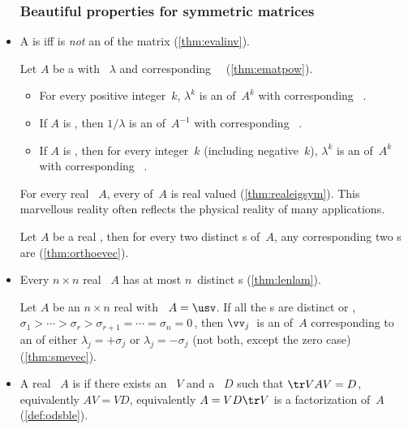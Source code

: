 \begin{itemize}
\subsubsection{Beautiful properties for symmetric matrices}

\item A  is  iff  is \emph{not} an  of the matrix (\cref{thm:evalinv}).

\itemme Let \(A\) be a  with ~\(\lambda\) and corresponding ~\xv\ (\cref{thm:ematpow}).
\begin{itemize}
\item For every positive integer~\(k\), \(\lambda^k\) is an  of~\(A^k\) with corresponding ~\xv.
\item If \(A\) is , then \(1/\lambda\) is an  of~\(A^{-1}\) with corresponding ~\xv.
\item If \(A\) is , then for every integer~\(k\) (including negative~\(k\)), \(\lambda^k\) is an  of~\(A^k\) with corresponding ~\xv.
\end{itemize}

\itemhi For every real ~\(A\), every  of~\(A\) is real valued (\cref{thm:realeigsym}).
This marvellous reality often reflects the physical reality of many applications.

\itemme Let \(A\) be a real , then for every two distinct s of~\(A\), any corresponding two s are  (\cref{thm:orthoevec}).

\item Every \(n\times n\) real ~\(A\) has at most \(n\)~distinct s (\cref{thm:lenlam}).

\itemme Let \(A\) be an \(n\times n\) real  with \svd\ \(A=\usv\).
If all the s are distinct or , \(\sigma_1>\cdots>\sigma_r>\sigma_{r+1}=\cdots=\sigma_n=0\)\,, then \(\vv_j\)~is an  of~\(A\) corresponding to an  of either \(\lambda_j=+\sigma_j\) or \(\lambda_j=-\sigma_j\) (not both, except the zero case)  (\cref{thm:smevec}).

\item A real ~\(A\) is  if there exists an ~\(V\) and a ~\(D\) such that \(\tr VAV=D\), equivalently \(AV=VD\), equivalently \(A=VD\tr V\) is a factorization of~\(A\) (\cref{def:odsble}).


\end{itemize}
